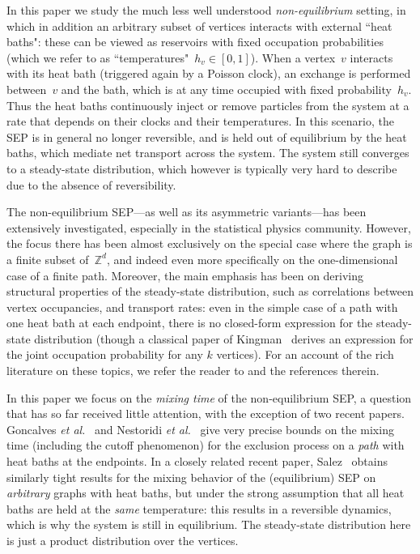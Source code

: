 \documentclass[11pt]{article}
\theoremstyle{plain}
\theoremstyle{definition}
\theoremstyle{remark}
\newcommand{\zset}{\mathbb Z}
\numberwithin{equation}{section}
\begin{document}
In this paper we study the much less well understood {\it non-equilibrium\/} setting, in which in addition an arbitrary
subset of vertices interacts with external ``heat baths": these can be viewed as reservoirs with fixed occupation
probabilities (which we refer to as ``temperatures"~$h_v \in [0,1]$).  When a vertex~$v$ interacts with its heat bath (triggered again
by a Poisson clock), an exchange is performed between~$v$ and the bath, which is at any time occupied with
fixed probability~$h_v$.  Thus the heat baths continuously inject or remove particles from the system at a rate
that depends on their clocks and their temperatures.  In this scenario, the SEP is in general no longer reversible, 
and is held out of equilibrium by the heat baths, which mediate net transport across the system.  
The system still converges to a steady-state distribution, which however is typically very
hard to describe due to the absence of reversibility.

The non-equilibrium SEP---as well as its asymmetric variants---has been extensively investigated, especially
in the statistical physics community.  However, the focus there has been almost exclusively on the special case 
where the graph is a finite subset of~$\zset^d$, and indeed even more specifically on the one-dimensional case of
a finite path.  Moreover, the main emphasis has been on deriving structural properties of the steady-state
distribution, such as correlations between vertex occupancies, and transport rates: even in the simple case
of a path with one heat bath at each endpoint, there is no closed-form expression for the steady-state
distribution (though a classical paper of Kingman~\cite{Kingman69} derives an expression for the joint occupation
probability for any $k$ vertices).  For an account of the rich literature on these topics, we refer the reader to
\cite{Spohn83,BertiniDGJL03,BertiniDGJL07,Derrida07,ChouMZ11} and the references therein.

In this paper we focus on the {\it mixing time\/} of the non-equilibrium SEP, a question that has so far
received little attention, with the exception of two recent papers.  
Goncalves {\it et al.}~\cite{Goncalves} and 
Nestoridi {\it et al.}~\cite{Nestoridi} give very precise bounds on the mixing time (including the cutoff phenomenon)
for the exclusion process on a \emph{path} with heat baths at the endpoints.  In a closely related recent
paper, Salez~\cite{Salez23} obtains 
similarly tight results for the mixing behavior of the (equilibrium) SEP on {\it arbitrary\/} graphs with heat baths, but under the
strong assumption that all heat baths are held at the {\it same\/} temperature: this results in a reversible dynamics,
which is why the system is still in equilibrium. The steady-state distribution here is just a product distribution
over the vertices. 
\end{document}
